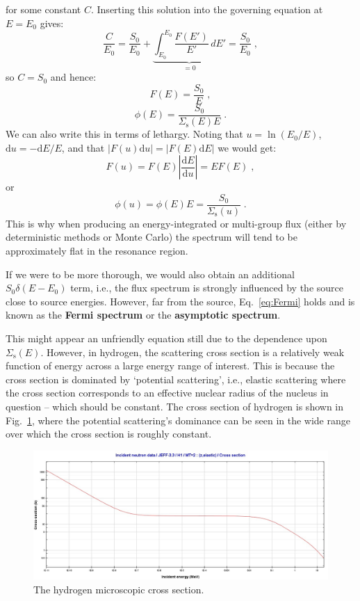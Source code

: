 for some constant $C$. Inserting this solution into the governing equation at $E=E_0$ gives:
\begin{equation*}
    \frac{C}{E_0} = \frac{S_0}{E_0} + \underbrace{\int_{E_0}^{E_0}\frac{F(E')}{E'}\,dE'}_{=0} = \frac{S_0}{E_0}\;\mathrm{,}
\end{equation*}
so $C = S_0$ and hence:
\begin{equation*}
    F(E) = \frac{S_0}{E}\;\mathrm{,}
\end{equation*}
\begin{equation}\label{eq:Fermi}
    \phi(E) = \frac{S_0}{\Sigma_\mathrm{s}(E)E}\;\mathrm{.}
\end{equation}
We can also write this in terms of lethargy. Noting that $u=\ln(E_0/E)$, $\mathrm{d}u = -\mathrm{d}E/E$, and that $|F(u)\mathrm{d}u| = |F(E)\mathrm{d}E|$ we would get:
\begin{equation*}
    F(u) = F(E) \left|\frac{\mathrm{d}E}{\mathrm{d}u}\right| = E F(E)\;\mathrm{,}
\end{equation*}
or
\begin{equation*}
    \phi(u) = \phi(E) E = \frac{S_0}{\Sigma_\mathrm{s}(u)}\;\mathrm{.}
\end{equation*}
This is why when producing an energy-integrated or multi-group flux (either by deterministic methods or Monte Carlo) the spectrum will tend to be approximately flat in the resonance region.

If we were to be more thorough, we would also obtain an additional $S_0\delta(E-E_0)$ term, i.e., the flux spectrum is strongly influenced by the source close to source energies. However, far from the source, Eq.~\eqref{eq:Fermi} holds and is known as the \textbf{Fermi spectrum} or the \textbf{asymptotic spectrum}.

This might appear an unfriendly equation still due to the dependence upon $\Sigma_\mathrm{s}(E)$. However, in hydrogen, the scattering cross section is a relatively weak function of energy across a large energy range of interest. This is because the cross section is dominated by `potential scattering', i.e., elastic scattering where the cross section corresponds to an effective nuclear radius of the nucleus in question -- which should be constant. The cross section of hydrogen is shown in Fig.~\ref{fig:XS_H}, where the potential scattering's dominance can be seen in the wide range over which the cross section is roughly constant. 

\begin{figure}[h!]
  \centering
  \includegraphics[scale=0.38]{./Figures/P2/hydrogen_XS.jpeg} 
  \caption{The hydrogen microscopic cross section.} 
  \label{fig:XS_H}
\end{figure}

